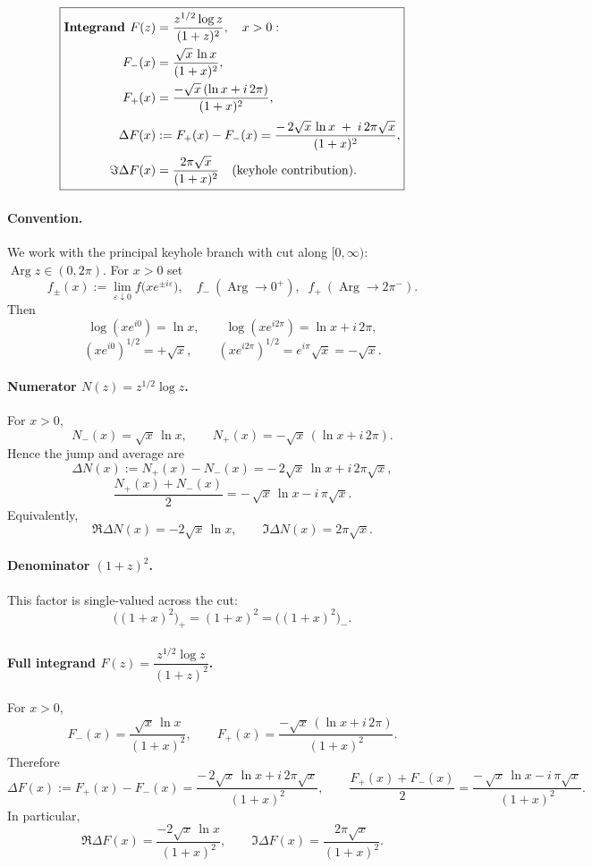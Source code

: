 \documentclass[12pt,a4paper]{article}
\DeclareMathOperator{\Arg}{Arg}
\begin{document}
\bigskip

\[
\boxed{%
\begin{aligned}
\textbf{Integrand } F(z)&=\frac{z^{1/2}\log z}{(1+z)^2}, \quad x>0: \\
F_-(x)&=\frac{\sqrt{x}\,\ln x}{(1+x)^2},\\
F_+(x)&=\frac{-\sqrt{x}\,(\ln x+i\,2\pi)}{(1+x)^2},\\[2pt]
\Delta F(x)&:=F_+(x)-F_-(x)=\frac{-\,2\sqrt{x}\,\ln x\;+\;i\,2\pi\sqrt{x}}{(1+x)^2},\\
\Im\Delta F(x)&=\frac{2\pi\sqrt{x}}{(1+x)^2}\quad\text{(keyhole contribution).}
\end{aligned}}
\]


\paragraph{Convention.}
We work with the principal keyhole branch with cut along $[0,\infty)$:
$\Arg z\in(0,2\pi)$.
For $x>0$ set
\[
f_\pm(x):=\lim_{\varepsilon\downarrow0} f\bigl(xe^{\pm i\varepsilon}\bigr),
\quad
f_-\ (\Arg\to 0^+),\;\; f_+\ (\Arg\to 2\pi^-).
\]
Then
\[
\log(xe^{i0})=\ln x,\qquad \log(xe^{i2\pi})=\ln x+i\,2\pi,
\]
\[
(xe^{i0})^{1/2}=+\sqrt{x},\qquad (xe^{i2\pi})^{1/2}=e^{i\pi}\sqrt{x}=-\sqrt{x}.
\]

\bigskip

\paragraph{Numerator \(N(z)=z^{1/2}\log z\).}
For $x>0$,
\[
N_-(x)=\sqrt{x}\,\ln x,\qquad
N_+(x)=-\sqrt{x}\,(\ln x+i\,2\pi).
\]
Hence the jump and average are
\[
\Delta N(x):=N_+(x)-N_-(x)=-\,2\sqrt{x}\,\ln x+i\,2\pi\sqrt{x},
\]
\[
\frac{N_+(x)+N_-(x)}{2}=-\,\sqrt{x}\,\ln x-i\,\pi\sqrt{x}.
\]
Equivalently,
\[
\Re\Delta N(x)=-2\sqrt{x}\,\ln x,\qquad
\Im\Delta N(x)=2\pi\sqrt{x}.
\]

\bigskip

\paragraph{Denominator \((1+z)^2\).}
This factor is single-valued across the cut:
\[
\bigl((1+x)^2\bigr)_+=(1+x)^2=\bigl((1+x)^2\bigr)_-.
\]

\bigskip

\paragraph{Full integrand \(F(z)=\dfrac{z^{1/2}\log z}{(1+z)^2}\).}
For $x>0$,
\[
F_-(x)=\frac{\sqrt{x}\,\ln x}{(1+x)^2},\qquad
F_+(x)=\frac{-\sqrt{x}\,(\ln x+i\,2\pi)}{(1+x)^2}.
\]
Therefore
\[
\Delta F(x):=F_+(x)-F_-(x)
=\frac{-\,2\sqrt{x}\,\ln x+i\,2\pi\sqrt{x}}{(1+x)^2},
\qquad
\frac{F_+(x)+F_-(x)}{2}
=\frac{-\,\sqrt{x}\,\ln x-i\,\pi\sqrt{x}}{(1+x)^2}.
\]
In particular,
\[
\Re\Delta F(x)=\frac{-2\sqrt{x}\,\ln x}{(1+x)^2},\qquad
\Im\Delta F(x)=\frac{2\pi\sqrt{x}}{(1+x)^2}.
\]
\end{document}
